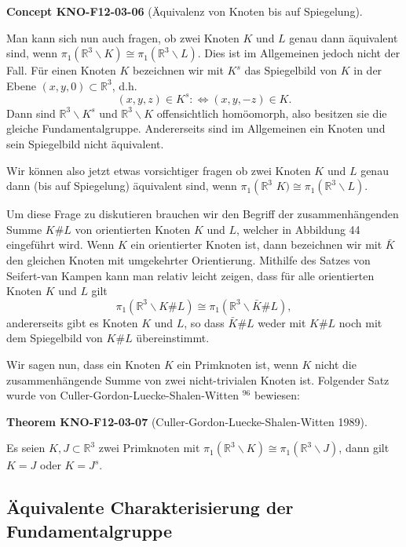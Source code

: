 \documentclass[10pt, letterpaper]{article}
\newcommand{\CustomHeading}[3]{%
  \par\medskip\noindent%
  \textbf{#1 #2} \textnormal{(#3)}.\enskip%
}
\newenvironment{THEO}[2]{\CustomHeading{Theorem}{#1}{#2}}{}
\newenvironment{CONC}[2]{\CustomHeading{Concept}{#1}{#2}}{}
\begin{document}
\begin{CONC}{KNO-F12-03-06}{Äquivalenz von Knoten bis auf Spiegelung}
Man kann sich nun auch fragen, ob zwei Knoten $K$ und $L$ genau dann äquivalent sind, wenn $\pi_1\left(\mathbb{R}^3 \backslash K\right) \cong \pi_1\left(\mathbb{R}^3 \backslash L\right)$. Dies ist im Allgemeinen jedoch nicht der Fall. Für einen Knoten $K$ bezeichnen wir mit $K^s$ das Spiegelbild von $K$ in der Ebene $(x, y, 0) \subset \mathbb{R}^3$, d.h.
$$
(x, y, z) \in K^s: \Leftrightarrow(x, y,-z) \in K .
$$
Dann sind $\mathbb{R}^3 \backslash K^s$ und $\mathbb{R}^3 \backslash K$ offensichtlich homöomorph, also besitzen sie die gleiche Fundamentalgruppe. Andererseits sind im Allgemeinen ein Knoten und sein Spiegelbild nicht äquivalent.

Wir können also jetzt etwas vorsichtiger fragen ob zwei Knoten $K$ und $L$ genau dann (bis auf Spiegelung) äquivalent sind, wenn $\pi_1\left(\mathbb{R}^3 \right.$ $K) \cong \pi_1\left(\mathbb{R}^3 \backslash L\right)$.

Um diese Frage zu diskutieren brauchen wir den Begriff der zusammenhängenden Summe $K \# L$ von orientierten Knoten $K$ und $L$, welcher in Abbildung 44 eingeführt wird. Wenn $K$ ein orientierter Knoten ist, dann bezeichnen wir mit $\bar{K}$ den gleichen Knoten mit umgekehrter Orientierung. Mithilfe des Satzes von Seifert-van Kampen kann man relativ leicht zeigen, dass für alle orientierten Knoten $K$ und $L$ gilt
$$
\pi_1\left(\mathbb{R}^3 \backslash K \# L\right) \cong \pi_1\left(\mathbb{R}^3 \backslash \bar{K} \# L\right),
$$
andererseits gibt es Knoten $K$ und $L$, so dass $\bar{K} \# L$ weder mit $K \# L$ noch mit dem Spiegelbild von $K \# L$ übereinstimmt.

Wir sagen nun, dass ein Knoten $K$ ein Primknoten ist, wenn $K$ nicht die zusammenhängende Summe von zwei nicht-trivialen Knoten ist. Folgender Satz wurde von Culler-Gordon-Luecke-Shalen-Witten ${ }^{96}$ bewiesen:
\end{CONC}

\begin{THEO}{KNO-F12-03-07}{Culler-Gordon-Luecke-Shalen-Witten 1989}
Es seien $K, J \subset \mathbb{R}^3$ zwei Primknoten mit $\pi_1\left(\mathbb{R}^3 \backslash K\right) \cong \pi_1\left(\mathbb{R}^3 \backslash J\right)$, dann gilt $K=J$ oder $K=J^s$.
\end{THEO}

\subsection{Äquivalente Charakterisierung der Fundamentalgruppe}
\end{document}
